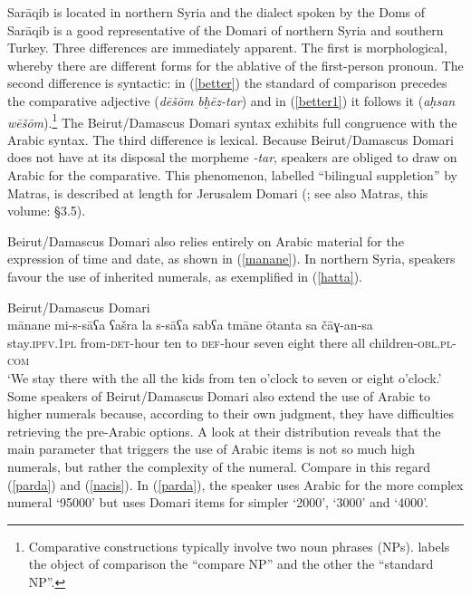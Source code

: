 \documentclass[output=paper]{langsci/langscibook}
\begin{document}
Sarāqib is located in northern Syria and the dialect spoken by the Doms of Sarāqib is a good representative of the Domari of northern Syria and southern Turkey. Three differences are immediately apparent. The first is morphological, whereby there are different forms for the ablative of the first-person pronoun. The second difference is syntactic: in (\ref{better}) the standard of comparison precedes the comparative adjective (\textit{dēšōm} \textit{bḫēz-tar}) and in (\ref{better1}) it follows it (\textit{aḥsan} \textit{wēšōm}).\footnote{Comparative constructions typically involve two noun phrases (NPs). \citet{Stassen2013} labels the object of comparison the “compare NP” and the other the “standard NP”.} The Beirut/Damascus Domari syntax exhibits full congruence with the Arabic syntax. The third difference is lexical. Because Beirut/Damascus Domari does not have at its disposal the morpheme \textit{{}-tar}, speakers are obliged to draw on Arabic for the comparative. This phenomenon, labelled ``bilingual suppletion'' by Matras, is described at length for Jerusalem Domari (\citealt[379--382]{Matras2012}; see also Matras, this volume: §3.5).

Beirut/Damascus Domari also relies entirely on Arabic material for the expression of time and date, as shown in (\ref{manane}). In northern Syria, speakers favour the use of inherited numerals, as exemplified in (\ref{hatta}).

\ea
{Beirut/Damascus Domari}\\ \label{manane}
\gll mānane mi-s-sāʕa ʕašra la s-sāʕa sabʕa tmāne ōtanta sa čāɣ-an-sa\\
     stay.\textsc{ipfv.1pl} from-\textsc{det}{}-hour ten to \textsc{def}{}-hour seven eight there all children-\textsc{obl.pl-com}\\
   \glt ‘We stay there with the all the kids from ten o'clock to seven or eight o'clock.’\\
\z
{}
Some speakers of Beirut/Damascus Domari also extend the use of Arabic to higher numerals because, according to their own judgment, they have difficulties retrieving the pre-Arabic options. A look at their distribution reveals that the main parameter that triggers the use of Arabic items is not so much high numerals, but rather the complexity of the numeral. Compare in this regard (\ref{parda}) and (\ref{nacis}). In (\ref{parda}), the speaker uses Arabic for the more complex numeral ‘95000’ but uses Domari items for simpler `2000', `3000' and `4000'.
\end{document}
